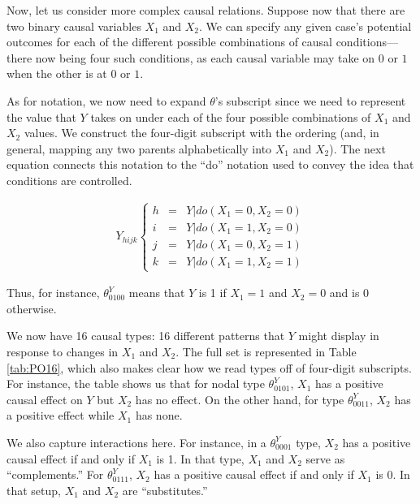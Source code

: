 \documentclass[
  12pt,
]{book}
\begin{document}
Now, let us consider more complex causal relations. Suppose now that there are two binary causal variables \(X_1\) and \(X_2\). We can specify any given case's potential outcomes for each of the different possible combinations of causal conditions---there now being four such conditions, as each causal variable may take on \(0\) or \(1\) when the other is at \(0\) or \(1\).

As for notation, we now need to expand \(\theta\)'s subscript since we need to represent the value that \(Y\) takes on under each of the four possible combinations of \(X_1\) and \(X_2\) values. We construct the four-digit subscript with the ordering (and, in general, mapping any two parents alphabetically into \(X_1\) and \(X_2\)). The next equation connects this notation to the ``do'' notation used to convey the idea that conditions are controlled.

\begin{eqnarray} 
Y_{hijk} \left\{\begin{array}{ccc}  h& =& Y|do(X_1=0, X_2=0)\\
 i &=& Y|do(X_1=1, X_2=0)\\
 j &=& Y|do(X_1=0, X_2=1)\\
 k &=& Y|do(X_1=1, X_2=1)
 \end{array} \right.
\end{eqnarray}

Thus, for instance, \(\theta^Y_{0100}\) means that \(Y\) is 1 if \(X_1=1\) and \(X_2=0\) and is 0 otherwise.

We now have 16 causal types: 16 different patterns that \(Y\) might display in response to changes in \(X_1\) and \(X_2\). The full set is represented in Table \ref{tab:PO16}, which also makes clear how we read types off of four-digit subscripts. For instance, the table shows us that for nodal type \(\theta^Y_{0101}\), \(X_1\) has a positive causal effect on \(Y\) but \(X_2\) has no effect. On the other hand, for type \(\theta^Y_{0011}\), \(X_2\) has a positive effect while \(X_1\) has none.

We also capture interactions here. For instance, in a \(\theta^Y_{0001}\) type, \(X_2\) has a positive causal effect if and only if \(X_1\) is 1. In that type, \(X_1\) and \(X_2\) serve as ``complements.'' For \(\theta^Y_{0111}\), \(X_2\) has a positive causal effect if and only if \(X_1\) is 0. In that setup, \(X_1\) and \(X_2\) are ``substitutes.''
\end{document}
